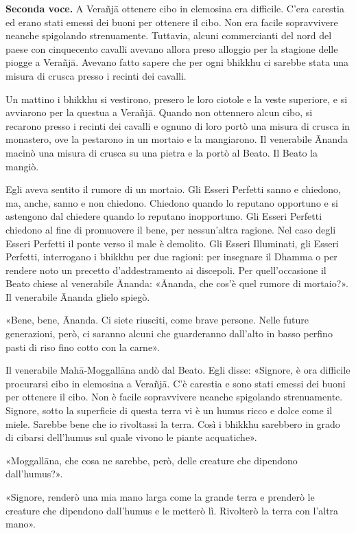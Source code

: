 \textbf{Seconda voce.} A Verañjā ottenere cibo in elemosina era difficile. C’era
carestia ed erano stati emessi dei buoni per ottenere il cibo. Non era
facile sopravvivere neanche spigolando strenuamente. Tuttavia, alcuni
commercianti del nord del paese con cinquecento cavalli avevano allora
preso alloggio per la stagione delle piogge a Verañjā. Avevano fatto
sapere che per ogni bhikkhu ci sarebbe stata una misura di crusca presso
i recinti dei cavalli.


Un mattino i bhikkhu si vestirono, presero le loro ciotole e la veste
superiore, e si avviarono per la questua a Verañjā. Quando non ottennero
alcun cibo, si recarono presso i recinti dei cavalli e ognuno di loro
portò una misura di crusca in monastero, ove la pestarono in un mortaio
e la mangiarono. Il venerabile Ānanda macinò una misura di crusca su una
pietra e la portò al Beato. Il Beato la mangiò.


Egli aveva sentito il rumore di un mortaio. Gli Esseri Perfetti sanno e
chiedono, ma, anche, sanno e non chiedono. Chiedono quando lo reputano
opportuno e si astengono dal chiedere quando lo reputano inopportuno.
Gli Esseri Perfetti chiedono al fine di promuovere il bene, per
nessun’altra ragione. Nel caso degli Esseri Perfetti il ponte verso il
male è demolito. Gli Esseri Illuminati, gli Esseri Perfetti, interrogano
i bhikkhu per due ragioni: per insegnare il Dhamma o per rendere noto un
precetto d’addestramento ai discepoli. Per quell’occasione il Beato
chiese al venerabile Ānanda: «Ānanda, che cos’è quel rumore di
mortaio?». Il venerabile Ānanda glielo spiegò.


«Bene, bene, Ānanda. Ci siete riusciti, come brave persone. Nelle future
generazioni, però, ci saranno alcuni che guarderanno dall’alto in basso
perfino pasti di riso fino cotto con la carne».


Il venerabile Mahā-Moggallāna andò dal Beato. Egli disse: «Signore, è
ora difficile procurarsi cibo in elemosina a Verañjā. C’è carestia e
sono stati emessi dei buoni per ottenere il cibo. Non è facile
sopravvivere neanche spigolando strenuamente. Signore, sotto la
superficie di questa terra vi è un humus ricco e dolce come il miele.
Sarebbe bene che io rivoltassi la terra. Così i bhikkhu sarebbero in
grado di cibarsi dell’humus sul quale vivono le piante acquatiche».


«Moggallāna, che cosa ne sarebbe, però, delle creature che dipendono
dall’humus?».


«Signore, renderò una mia mano larga come la grande terra e prenderò le
creature che dipendono dall’humus e le metterò lì. Rivolterò la terra
con l’altra mano».


